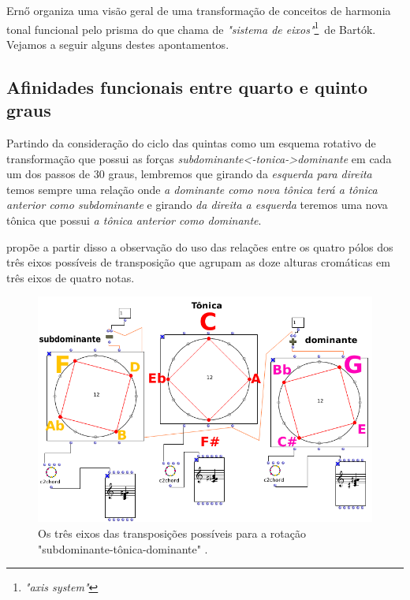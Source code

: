 \documentclass[
	12pt,				%
	openright,			%
	twoside,			%
	a4paper,			%
	english,			%
	french,				%
	spanish,			%
	brazil				%
	]{abntex2}
\begin{document}
Ern{\H{o}}  organiza uma visão geral de uma transformação de conceitos de harmonia tonal funcional pelo prisma do que chama de \textit{"sistema de eixos"}\footnote{\textit{"axis system"}}\ de Bartók. Vejamos a seguir alguns destes apontamentos. \pagebreak


\subsection{Afinidades funcionais entre quarto e quinto graus}

Partindo da consideração do ciclo das quintas como um esquema rotativo de transformação que possui as forças \textit{subdominante<-tonica->dominante} em cada um dos passos de 30 graus, lembremos que girando da \textit{esquerda para direita} temos sempre uma relação onde \textit{a dominante como nova tônica terá a tônica anterior como subdominante} e girando \textit{da direita a esquerda} teremos uma nova tônica que possui \textit{a tônica anterior como dominante}. 

 propõe a partir disso a observação do uso das relações entre os quatro pólos dos três eixos possíveis de transposição que agrupam as doze alturas cromáticas em três eixos de quatro notas. 

\begin{figure}[!h]
	\caption{\label{fig_grafico}Os três eixos das transposições possíveis para a rotação "subdominante-tônica-dominante" .}
	\begin{center}
	    \includegraphics[scale=0.45]{axis/axisOM.png}
	\end{center}
\end{figure}
\end{document}
